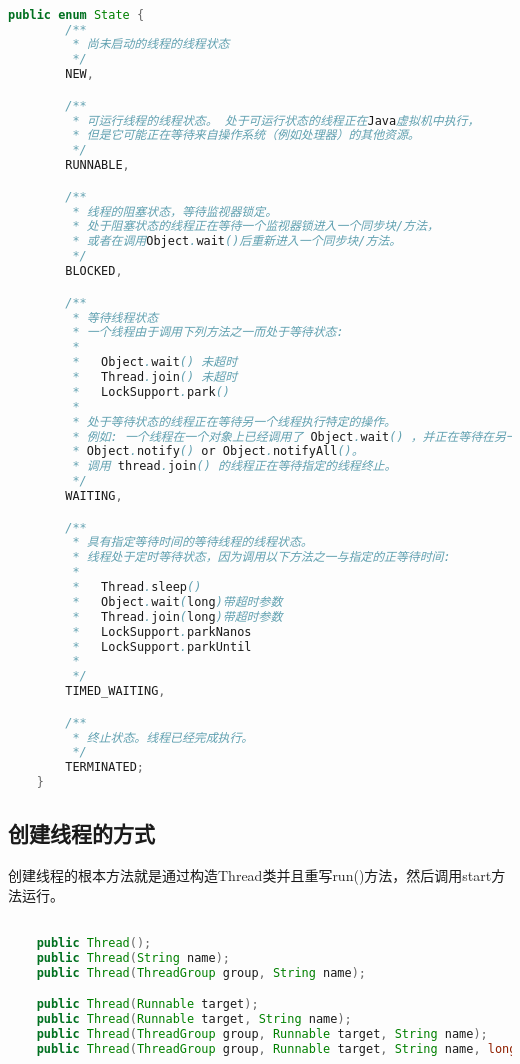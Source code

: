 \begin{lstlisting}[language=java]

public enum State {
        /**
         * 尚未启动的线程的线程状态
         */
        NEW,

        /**
         * 可运行线程的线程状态。 处于可运行状态的线程正在Java虚拟机中执行，
         * 但是它可能正在等待来自操作系统（例如处理器）的其他资源。
         */
        RUNNABLE,

        /**
         * 线程的阻塞状态，等待监视器锁定。
         * 处于阻塞状态的线程正在等待一个监视器锁进入一个同步块/方法，
         * 或者在调用Object.wait()后重新进入一个同步块/方法。
         */
        BLOCKED,

        /**
         * 等待线程状态
         * 一个线程由于调用下列方法之一而处于等待状态:
         * 
         *   Object.wait() 未超时
         *   Thread.join() 未超时
         *   LockSupport.park()
         * 
         * 处于等待状态的线程正在等待另一个线程执行特定的操作。
         * 例如: 一个线程在一个对象上已经调用了 Object.wait() ，并正在等待在另一个线程在另一对象上调用
         * Object.notify() or Object.notifyAll()。
         * 调用 thread.join() 的线程正在等待指定的线程终止。
         */
        WAITING,

        /**
         * 具有指定等待时间的等待线程的线程状态。
         * 线程处于定时等待状态，因为调用以下方法之一与指定的正等待时间:
         * 
         *   Thread.sleep()
         *   Object.wait(long)带超时参数
         *   Thread.join(long)带超时参数
         *   LockSupport.parkNanos
         *   LockSupport.parkUntil
         * 
         */
        TIMED_WAITING,

        /**
         * 终止状态。线程已经完成执行。
         */
        TERMINATED;
    }

\end{lstlisting}


\subsection{创建线程的方式}

创建线程的根本方法就是通过构造Thread类并且重写run()方法，然后调用start方法运行。

\begin{lstlisting}[language=java]

    public Thread();
    public Thread(String name);
    public Thread(ThreadGroup group, String name);

    public Thread(Runnable target);
    public Thread(Runnable target, String name);
    public Thread(ThreadGroup group, Runnable target, String name);
    public Thread(ThreadGroup group, Runnable target, String name, long stackSize);

\end{lstlisting}


